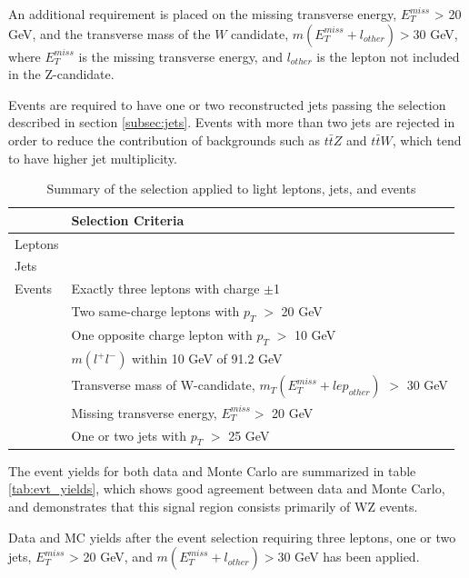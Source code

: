 \documentclass[NOTE, atlasdraft=true, texlive=2016, UKenglish]{\ATLASLATEXPATH atlasdoc}
\begin{document}
An additional requirement is placed on the missing transverse energy, $E^{miss}_T$ > 20 GeV, and the transverse mass of the $W$ candidate, $m(E^{miss}_T + l_{other}) > 30$ GeV, where $E^{miss}_T$ is the missing transverse energy, and $l_{other}$ is the lepton not included in the Z-candidate. 

Events are required to have one or two reconstructed jets passing the selection described in section \ref{subsec:jets}. Events with more than two jets are rejected in order to reduce the contribution of backgrounds such as $t\bar{t}Z$ and $t\bar{t}W$, which tend to have higher jet multiplicity.  

\begin{table}[h]
    \centering
    \begin{tabular}{ll}
        \hline\hline
         & Selection Criteria \\
        \hline\hline
        Leptons & \\
        \hline
        Jets & \\
        \hline 
        Events &  Exactly three leptons with charge $\pm$1 \\
            &  Two same-charge leptons with $p_T$ $>$ 20 GeV \\
            &  One opposite charge lepton with $p_T$ $>$ 10 GeV \\
            &  $m(l^+l^-)$ within 10 GeV of 91.2 GeV \\
            &  Transverse mass of W-candidate, $m_T(E_T^{miss} + lep_{other})$ $>$ 30 GeV \\
            &  Missing transverse energy, $E_T^{miss} >$ 20 GeV \\
            &  One or two jets with $p_T$ $>$ 25 GeV \\
        \hline\hline
    \end{tabular}
    \caption{Summary of the selection applied to light leptons, jets, and events}
    \label{tab:selection}
\end{table}

The event yields for both data and Monte Carlo are summarized in table \ref{tab:evt_yields}, which shows good agreement between data and Monte Carlo, and demonstrates that this signal region consists primarily of WZ events.

\begin{table}[H]
    \centering
        
    \caption{Data and MC yields after the event selection requiring three leptons, one or two jets, $E^{miss}_T$ > 20 GeV, and $m(E^{miss}_T + l_{other}) > 30$ GeV has been applied.}
    \label{tab:evt_yields}
\end{table}
\end{document}
